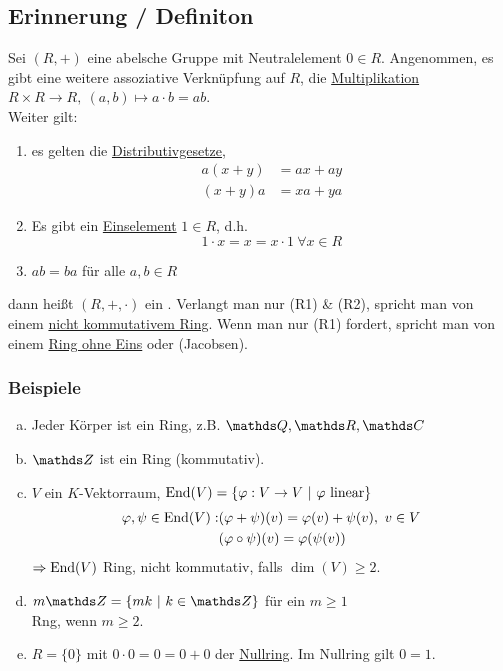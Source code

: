 \subsection{Erinnerung / Definiton}
\label{sub:erinnerung_def}
Sei $(R,+)$ eine abelsche Gruppe mit Neutralelement $0\in R$. 
Angenommen, es gibt eine weitere assoziative Verknüpfung auf $R$, die \uline{Multiplikation} $R\times R\to R,~ (a,b)\mapsto a\cdot b=ab$.\\
Weiter gilt: 
\begin{enumerate}[(R1)]
	\item es gelten die \uline{Distributivgesetze},
	\begin{equation*}
	\begin{aligned}
		a(x+y)&= ax+ay\\
		(x+y)a&= xa+ya
	\end{aligned}
	\end{equation*}
	\item Es gibt ein \uline{Einselement} $1\in R$, d.h. 
	\[
	1\cdot x=x=x\cdot 1~\forall x\in R
	\]
	\item $ab=ba$ für alle $a,b\in R$
\end{enumerate}
dann heißt $(R,+,\cdot)$ ein . 
Verlangt man nur (R1) \& (R2), spricht man von einem \uline{nicht kommutativem Ring}. 
Wenn man nur (R1) fordert, spricht man von einem \uline{Ring ohne Eins} oder  (Jacobsen).

\subsubsection*{Beispiele}
\begin{enumerate}[(a)]
	\item Jeder Körper ist ein Ring, z.B. $\Q,\R,\C$
	\item $\Z$ ist ein Ring (kommutativ).
	\item $V$ ein $K$-Vektorraum, $\operatorname{End}(V)=\{\varphi:V\to V~|~\varphi \text{ linear}\}$\\
	\begin{equation*}
	\begin{aligned}
		\varphi,\psi\in \operatorname{End}(V): &(\varphi+\psi)(v)=\varphi(v)+\psi(v),~v\in V\\
		&(\varphi\circ\psi)(v)=\varphi(\psi(v))
	\end{aligned}
	\end{equation*}
	$\Rightarrow \operatorname{End}(V)$ Ring, nicht kommutativ, falls $\dim(V)\ge 2$.
	\item $m\Z=\{mk~|~k\in \Z \}$ für ein $m\ge 1$\\
	Rng, wenn $m\ge 2$.
	\item $R=\{0\}$ mit $0\cdot 0=0=0+0$ der \uline{Nullring}. 
	Im Nullring gilt $0=1$. 
\end{enumerate}

